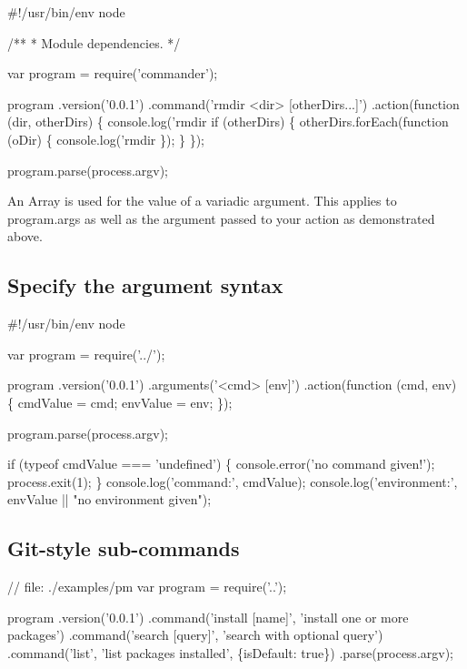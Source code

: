 \begin{DoxyCode}
#!/usr/bin/env node

/**
 * Module dependencies.
 */

var program = require('commander');

program
  .version('0.0.1')
  .command('rmdir <dir> [otherDirs...]')
  .action(function (dir, otherDirs) \{
    console.log('rmdir %
    if (otherDirs) \{
      otherDirs.forEach(function (oDir) \{
        console.log('rmdir %
      \});
    \}
  \});

program.parse(process.argv);
\end{DoxyCode}


An {\ttfamily Array} is used for the value of a variadic argument. This applies to {\ttfamily program.\+args} as well as the argument passed to your action as demonstrated above.

\subsection*{Specify the argument syntax}


\begin{DoxyCode}
#!/usr/bin/env node

var program = require('../');

program
  .version('0.0.1')
  .arguments('<cmd> [env]')
  .action(function (cmd, env) \{
     cmdValue = cmd;
     envValue = env;
  \});

program.parse(process.argv);

if (typeof cmdValue === 'undefined') \{
   console.error('no command given!');
   process.exit(1);
\}
console.log('command:', cmdValue);
console.log('environment:', envValue || "no environment given");
\end{DoxyCode}


\subsection*{Git-\/style sub-\/commands}


\begin{DoxyCode}
// file: ./examples/pm
var program = require('..');

program
  .version('0.0.1')
  .command('install [name]', 'install one or more packages')
  .command('search [query]', 'search with optional query')
  .command('list', 'list packages installed', \{isDefault: true\})
  .parse(process.argv);
\end{DoxyCode}


